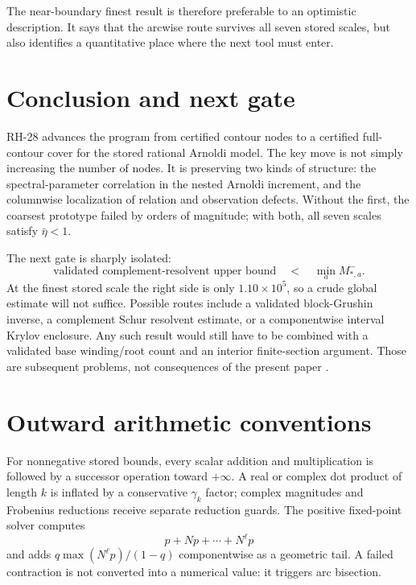 \documentclass[11pt]{article}
\theoremstyle{definition}
\theoremstyle{remark}
\begin{document}
The near-boundary finest result is therefore preferable to an optimistic
description.  It says that the arcwise route survives all seven stored
scales, but also identifies a quantitative place where the next tool must
enter.

\section{Conclusion and next gate}
\label{sec:conclusion}

RH-28 advances the program from certified contour nodes to a certified
full-contour cover for the stored rational Arnoldi model.  The key move is
not simply increasing the number of nodes.  It is preserving two kinds of
structure: the spectral-parameter correlation in the nested Arnoldi
increment, and the columnwise localization of relation and observation
defects.  Without the first, the coarsest prototype failed by orders of
magnitude; with both, all seven scales satisfy $\bar\eta<1$.

The next gate is sharply isolated:
\[
 \text{validated complement-resolvent upper bound}
 \quad <\quad \min_a M_{*,a}^-.
\]
At the finest stored scale the right side is only $1.10\times10^5$, so a
crude global estimate will not suffice.  Possible routes include a validated
block-Grushin inverse, a complement Schur resolvent estimate, or a
componentwise interval Krylov enclosure.  Any such result would still have
to be combined with a validated base winding/root count and an interior
finite-section argument.  Those are subsequent problems, not consequences
of the present paper
\citep{SjoestrandZworski2007,TrefethenEmbree2005}.

\appendix

\section{Outward arithmetic conventions}
\label{app:arithmetic}

For nonnegative stored bounds, every scalar addition and multiplication is
followed by a successor operation toward $+\infty$.  A real or complex dot
product of length $k$ is inflated by a conservative $\gamma_k$ factor;
complex magnitudes and Frobenius reductions receive separate reduction
guards.  The positive fixed-point solver computes
\[
 p+Np+\cdots+N^\ell p
\]
and adds $q\max(N^\ell p)/(1-q)$ componentwise as a geometric tail.  A failed
contraction is not converted into a numerical value: it triggers arc
bisection.
\end{document}
